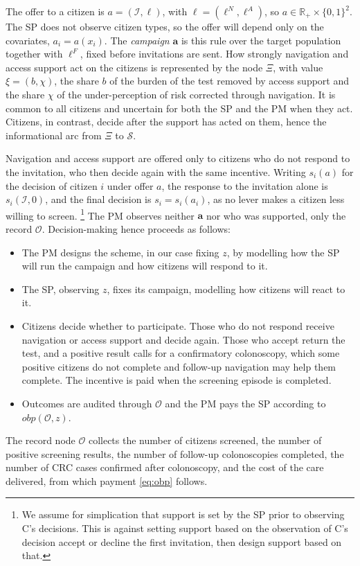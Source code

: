 \documentclass[12pt]{article}
\begin{document}
The offer to a citizen is $a = (\mathcal{I}, \ell)$, with $\ell = (\ell^{N}, \ell^{A})$, so $a \in \mathbb{R}_{+} \times \{0,1\}^{2}$. The SP does not observe citizen types, so the offer will depend only on the covariates, $a_i = a(x_i)$. The \emph{campaign} $\mathbf{a}$ is this rule over the target population together with $\ell^F$, fixed before invitations are sent. How strongly navigation and access support act on the citizens is represented by the node $\Xi$, with value $\xi = (b, \chi)$, the share $b$ of the burden of the test removed by access support and the share $\chi$ of the under-perception of risk corrected through navigation. It is common to all citizens and uncertain for both the SP and the PM when they act. Citizens, in contrast, decide after the support has acted on them, hence the informational arc from $\Xi$ to $\mathcal{S}$.

Navigation and access support are offered only to citizens who do not respond to the invitation, who then decide again with the same incentive. Writing $s_i(a)$ for the decision of citizen $i$ under offer $a$, the response to the invitation alone is $s_i(\mathcal{I}, 0)$, and the final decision is $s_i = s_i(a_i)$, as no lever makes a citizen less willing to screen. \footnote{We assume for simplication that support is set by the SP prior to observing C's decisions. This is against setting support based on the observation of C's decision accept or decline the first invitation, then design support based on that.} The PM observes neither
$\mathbf{a}$ nor who was supported, only the record $\mathcal{O}$. Decision-making hence proceeds as follows:
\begin{itemize}
    \item The PM designs the scheme, in our case fixing $z$, by modelling how the SP will run the campaign and how citizens will respond to it.

    \item The SP, observing $z$, fixes its campaign, modelling how citizens will react to it.

    \item Citizens decide whether to participate. Those who do not respond receive navigation or access support and decide again. Those who accept return the test, and a positive result calls for a confirmatory colonoscopy, which some positive citizens do not complete and follow-up navigation may help them complete. The incentive is paid when the screening episode is completed.

    \item Outcomes are audited through $\mathcal{O}$ and the PM pays the SP according to $obp(\mathcal{O}, z)$.

\end{itemize}
The record node $\mathcal{O}$ collects the number of citizens screened, the number of positive screening results, the number of follow-up colonoscopies completed, the number of CRC cases confirmed after colonoscopy, and the cost of the care delivered, from which payment \eqref{eq:obp} follows.
\end{document}
